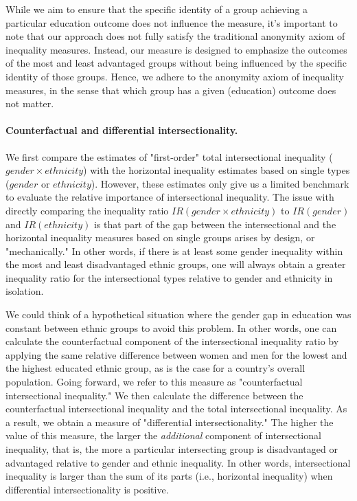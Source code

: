 While we aim to ensure that the specific identity of a group achieving a particular education outcome does not influence the measure, it's important to note that our approach does not fully satisfy the traditional anonymity axiom of inequality measures. Instead, our measure is designed to emphasize the outcomes of the most and least advantaged groups without being influenced by the specific identity of those groups. Hence, we adhere to the anonymity axiom of inequality measures, in the sense that which group has a given (education) outcome does not matter. 

\hypertarget{counterfactual-and-differential-intersectionality.}{%
\paragraph{Counterfactual and differential intersectionality.}\label{counterfactual-and-differential.}}

We first compare the estimates of "first-order" total intersectional inequality ($gender \times ethnicity$) with the horizontal inequality estimates based on single types ($gender$ or $ethnicity$). However, these estimates only give us a limited benchmark to evaluate the relative importance of intersectional inequality. The issue with directly comparing the inequality ratio $IR(gender \times ethnicity)$ to $IR(gender)$ and $IR(ethnicity)$ is that part of the gap between the intersectional and the horizontal inequality measures based on single groups arises by design, or "mechanically." In other words, if there is at least some gender inequality within the most and least disadvantaged ethnic groups, one will always obtain a greater inequality ratio for the intersectional types relative to gender and ethnicity in isolation.

We could think of a hypothetical situation where the gender gap in education was constant between ethnic groups to avoid this problem. In other words, one can calculate the counterfactual component of the intersectional inequality ratio by applying the same relative difference between women and men for the lowest and the highest educated ethnic group, as is the case for a country's overall population. Going forward, we refer to this measure as "counterfactual intersectional inequality." We then calculate the difference between the counterfactual intersectional inequality and the total intersectional inequality. As a result, we obtain a measure of "differential intersectionality." The higher the value of this measure, the larger the \textit{additional} component of intersectional inequality, that is, the more a particular intersecting group is disadvantaged or advantaged relative to gender and ethnic inequality. In other words, intersectional inequality is larger than the sum of its parts (i.e., horizontal inequality) when differential intersectionality is positive. 


